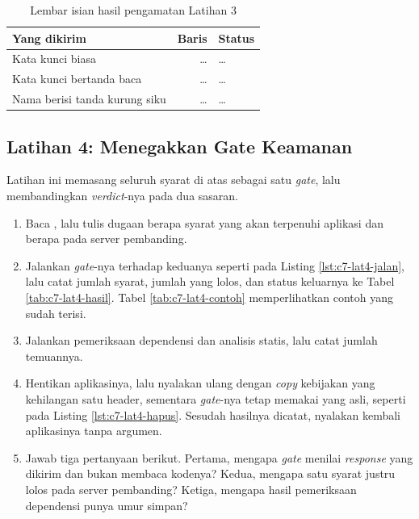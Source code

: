 \begin{table}[!htb]
  \centering
  \caption{Lembar isian hasil pengamatan Latihan 3}
  \label{tab:c7-lat3-hasil}
  \begin{tabularx}{\textwidth}{Xrl}
    \hline
    \textbf{Yang dikirim} & \textbf{Baris} & \textbf{Status} \\
    \hline
    Kata kunci biasa & \dots & \dots \\
    \hline
    Kata kunci bertanda baca & \dots & \dots \\
    \hline
    Nama berisi tanda kurung siku & \dots & \dots \\
    \hline
  \end{tabularx}
\end{table}

\subsection*{Latihan 4: Menegakkan Gate Keamanan}

Latihan ini memasang seluruh syarat di atas sebagai satu \textit{gate}, lalu
membandingkan \textit{verdict}-nya pada dua sasaran.

\begin{enumerate}
  \item Baca , lalu tulis dugaan
        berapa syarat yang akan terpenuhi aplikasi dan berapa pada server
        pembanding.
  \item Jalankan \textit{gate}-nya terhadap keduanya seperti pada Listing
        \ref{lst:c7-lat4-jalan}, lalu catat jumlah syarat, jumlah yang lolos,
        dan status keluarnya ke Tabel \ref{tab:c7-lat4-hasil}. Tabel
        \ref{tab:c7-lat4-contoh} memperlihatkan contoh yang sudah terisi.
  \item Jalankan pemeriksaan dependensi dan analisis statis, lalu catat
        jumlah temuannya.
  \item Hentikan aplikasinya, lalu nyalakan ulang dengan \textit{copy} kebijakan
        yang kehilangan satu header, sementara \textit{gate}-nya tetap
        memakai  yang asli, seperti
        pada Listing \ref{lst:c7-lat4-hapus}. Sesudah hasilnya dicatat,
        nyalakan kembali aplikasinya tanpa argumen.
  \item Jawab tiga pertanyaan berikut. Pertama, mengapa \textit{gate} menilai
        \textit{response} yang dikirim dan bukan membaca kodenya? Kedua,
        mengapa satu syarat justru lolos pada server pembanding? Ketiga,
        mengapa hasil pemeriksaan dependensi punya umur simpan?
\end{enumerate}


